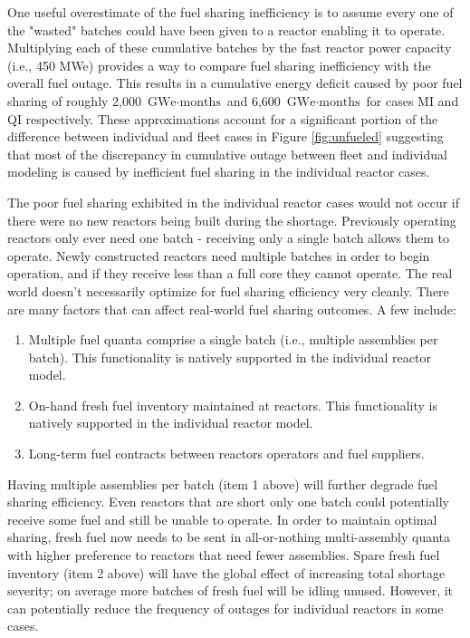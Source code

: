 \documentclass{style}
\begin{document}
One useful overestimate of the fuel sharing inefficiency is to assume every
one of the "wasted" batches could have been given to a reactor enabling it to
operate.  Multiplying each of these cumulative batches by the fast reactor power capacity
(i.e., 450 MWe) provides a way to compare fuel sharing inefficiency with the
overall fuel outage.  This results in a cumulative energy deficit caused by
poor fuel sharing of roughly 2,000 $\text{GWe} \cdot \text{months}$ and 6,600
$\text{GWe} \cdot \text{months}$ for cases MI and QI respectively.  These
approximations account for a significant portion of the difference between individual
and fleet cases in Figure \ref{fig:unfueled} suggesting that most of the
discrepancy in cumulative outage between fleet and individual modeling is
caused by inefficient fuel sharing in the individual reactor cases.

The poor fuel sharing exhibited in the individual reactor cases would not
occur if there were no new reactors being built during the shortage.
Previously operating reactors only ever need one batch - receiving only a
single batch allows them to operate.  Newly constructed reactors need multiple
batches in order to begin operation, and if they receive less than a full core
they cannot operate.  The real world doesn't necessarily optimize for fuel
sharing efficiency very cleanly. There are many factors that can affect
real-world fuel sharing outcomes.  A few include:

\begin{enumerate}

    \item Multiple fuel quanta comprise a single batch (i.e., multiple
        assemblies per batch). This functionality is natively supported in the
        individual reactor model.

    \item On-hand fresh fuel inventory maintained at reactors. This
        functionality is natively supported in the individual reactor model.

    \item Long-term fuel contracts between reactors operators and fuel
        suppliers.

\end{enumerate}

Having multiple assemblies per batch (item 1 above) will further degrade fuel
sharing efficiency.  Even reactors that are short only one batch could
potentially receive some fuel and still be unable to operate.  In order to
maintain optimal sharing, fresh fuel now needs to be sent in all-or-nothing
multi-assembly quanta with higher preference to reactors that need fewer
assemblies.  Spare fresh fuel inventory (item 2 above) will have the global
effect of increasing total shortage severity; on average more batches of fresh
fuel will be idling unused.  However, it can potentially reduce the frequency
of outages for individual reactors in some cases.
\end{document}
